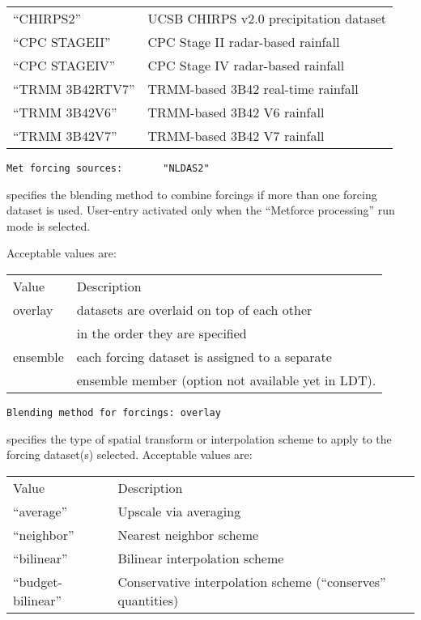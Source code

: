 \begin{tabular}{ll}
 ``CHIRPS2''           & UCSB CHIRPS v2.0 precipitation dataset     \\
 ``CPC STAGEII''       & CPC Stage II radar-based rainfall          \\
 ``CPC STAGEIV''       & CPC Stage IV radar-based rainfall          \\
 ``TRMM 3B42RTV7''     & TRMM-based 3B42 real-time rainfall         \\
 ``TRMM 3B42V6''       & TRMM-based 3B42 V6 rainfall                \\
 ``TRMM 3B42V7''       & TRMM-based 3B42 V7 rainfall                \\
 \end{tabular}
 

 \begin{Verbatim}[frame=single]
Met forcing sources:       "NLDAS2"
 \end{Verbatim}

 
  specifies the
 blending method to combine forcings if more than one 
 forcing dataset is used. User-entry activated only when
 the ``Metforce processing'' run mode is selected.

 Acceptable values are:

 \begin{tabular}{ll}
 Value    & Description                                    \\
 overlay  & datasets are overlaid on top of each other     \\
          & in the order they are specified                \\
 ensemble & each forcing dataset is assigned to a separate \\
          & ensemble member (option not available yet in LDT). \\
 \end{tabular}
 

 \begin{Verbatim}[frame=single]
Blending method for forcings: overlay
 \end{Verbatim}

 
 specifies the type of spatial transform or interpolation
 scheme to apply to the forcing dataset(s) selected.
 Acceptable values are:

 \begin{tabular}{ll}
 Value & Description                                    \\
 ``average''           & Upscale via averaging          \\
 ``neighbor''          & Nearest neighbor scheme        \\
 ``bilinear''          & Bilinear interpolation scheme  \\
 ``budget-bilinear''   & Conservative interpolation scheme (``conserves'' quantities) \\
 \end{tabular}

